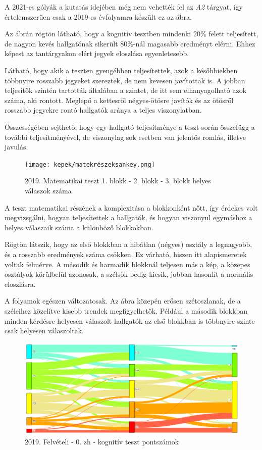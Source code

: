 \documentclass[12pt]{article}
\begin{document}
A 2021-es gólyák a kutatás idejében még nem vehették fel az \textit{A2} tárgyat, így értelemszerűen csak a 2019-es évfolyamra készült ez az ábra.

Az ábrán rögtön látható, hogy a kognitív tesztben mindenki 20\% felett teljesített, de nagyon kevés hallgatónak sikerült 80\%-nál magasabb eredményt elérni. Ehhez képest az tantárgyakon elért jegyek eloszlása egyenletesebb. 

Látható, hogy akik a teszten gyengébben teljesítettek, azok a későbbiekben többnyire rosszabb jegyeket szereztek, de nem kevesen javítottak is. A jobban teljesítők szintén tartották általában a szintet, de itt sem elhanyagolható azok száma, aki rontott. Meglepő a kettesről négyes-ötösre javítók és az ötösről rosszabb jegyekre rontó hallgatók aránya a teljes viszonylatban.

Összességében sejthető, hogy egy hallgató teljesítménye a teszt során összefügg a további teljesítményével, de viszonylag sok esetben van jelentős romlás, illetve javulás.

\begin{figure}[H]
\centering
\texttt{[image: kepek/matekrészeksankey.png]}
\caption{2019. Matematikai teszt 1. blokk - 2. blokk - 3. blokk helyes válaszok száma}
\label{fig:matekrészeksankey}
\end{figure}

A teszt matematikai részének a komplexitása a blokkonként nőtt, így érdekes volt megvizsgálni, hogyan teljesítettek a hallgatók, és hogyan viszonyul egymáshoz a helyes válaszaik száma a különböző blokkokban.

Rögtön látszik, hogy az első blokkban a hibátlan (négyes) osztály a legnagyobb, és a rosszabb eredmények száma csökken. Ez várható, hiszen itt alapismeretek voltak felmérve. A második és harmadik blokknál teljesen más a kép, a közepes osztályok körülbelül azonosak, a szélsők pedig kicsik, jobban hasonlít a normális eloszlásra.

A folyamok egészen változatosak. Az ábra közepén erősen szétoszlanak, de a széleihez közelítve kisebb trendek megfigyelhetők. Például a második blokkban minden kérdésre helyesen válaszolt hallgatók az első blokkban is többnyire szinte csak helyesen válaszoltak.

\begin{figure}[H]
\centering
\includegraphics[scale=0.573]{kepek/2019_old_felvi_0zh_teszt.png}
\caption{2019. Felvételi - 0. zh - kognitív teszt pontszámok}
\label{fig:2019_old_felvi_0zh_teszt}
\end{figure}
\end{document}
